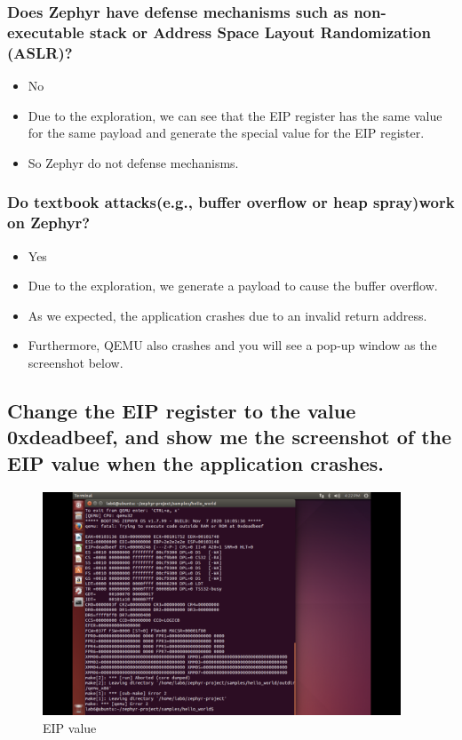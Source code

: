 \documentclass[onecolumn,oneside]{SUSTechHomework}
\begin{document}
      \subsubsection{Does Zephyr have defense mechanisms such as non-executable stack or Address Space Layout Randomization (ASLR)?}

        \begin{itemize}
          \item No
          \item Due to the exploration, we can see that the EIP register has the same value for the same payload and generate the special value for the EIP register.
          \item So Zephyr do not defense mechanisms.
        \end{itemize}

      \subsubsection{Do textbook attacks(e.g., buffer overflow or heap spray)work on Zephyr?}

        \begin{itemize}
          \item Yes
          \item Due to the exploration, we generate a payload to cause the buffer overflow. 
          \item As we expected, the application crashes due to an invalid return address.
          \item Furthermore, QEMU also crashes and you will see a pop-up window as the screenshot below.
        \end{itemize}

    \subsection{Change the EIP register to the value 0xdeadbeef, and show me the screenshot of the EIP value when the application crashes.}

      \begin{figure}[H]
        \centering
        \includegraphics[width=0.95\textwidth]{img/pic1.png}
        \caption{EIP value}
      \end{figure}
\end{document}
